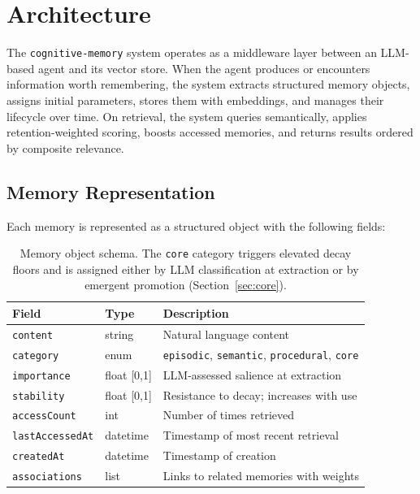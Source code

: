 \documentclass[11pt,a4paper]{article}
\begin{document}
\section{Architecture}

The \texttt{cognitive-memory} system operates as a middleware layer between an LLM-based agent and its vector store. When the agent produces or encounters information worth remembering, the system extracts structured memory objects, assigns initial parameters, stores them with embeddings, and manages their lifecycle over time. On retrieval, the system queries semantically, applies retention-weighted scoring, boosts accessed memories, and returns results ordered by composite relevance.

\subsection{Memory Representation}

Each memory is represented as a structured object with the following fields:

\begin{table}[h]
\centering
\small
\begin{tabular}{@{}lll@{}}
\toprule
\textbf{Field} & \textbf{Type} & \textbf{Description} \\
\midrule
\texttt{content} & string & Natural language content \\
\texttt{category} & enum & \texttt{episodic}, \texttt{semantic}, \texttt{procedural}, \texttt{core} \\
\texttt{importance} & float [0,1] & LLM-assessed salience at extraction \\
\texttt{stability} & float [0,1] & Resistance to decay; increases with use \\
\texttt{accessCount} & int & Number of times retrieved \\
\texttt{lastAccessedAt} & datetime & Timestamp of most recent retrieval \\
\texttt{createdAt} & datetime & Timestamp of creation \\
\texttt{associations} & list & Links to related memories with weights \\
\bottomrule
\end{tabular}
\caption{Memory object schema. The \texttt{core} category triggers elevated decay floors and is assigned either by LLM classification at extraction or by emergent promotion (Section~\ref{sec:core}).}
\label{tab:schema}
\end{table}
\end{document}
